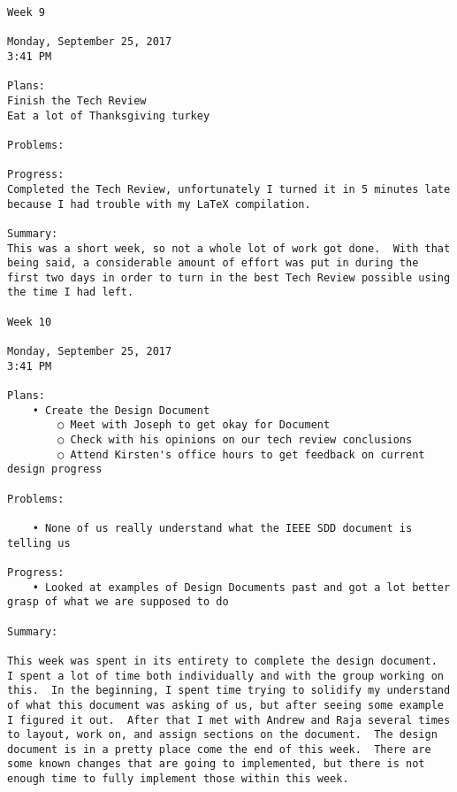 \begin{lstlisting}
Week 9

Monday, September 25, 2017
3:41 PM

Plans:
Finish the Tech Review
Eat a lot of Thanksgiving turkey

Problems:

Progress:
Completed the Tech Review, unfortunately I turned it in 5 minutes late because I had trouble with my LaTeX compilation.

Summary:
This was a short week, so not a whole lot of work got done.  With that being said, a considerable amount of effort was put in during the first two days in order to turn in the best Tech Review possible using the time I had left.

Week 10

Monday, September 25, 2017
3:41 PM

Plans:
	• Create the Design Document
		○ Meet with Joseph to get okay for Document
		○ Check with his opinions on our tech review conclusions
		○ Attend Kirsten's office hours to get feedback on current design progress

Problems:
	
	• None of us really understand what the IEEE SDD document is telling us

Progress:
	• Looked at examples of Design Documents past and got a lot better grasp of what we are supposed to do

Summary:

This week was spent in its entirety to complete the design document.  I spent a lot of time both individually and with the group working on this.  In the beginning, I spent time trying to solidify my understand of what this document was asking of us, but after seeing some example I figured it out.  After that I met with Andrew and Raja several times to layout, work on, and assign sections on the document.  The design document is in a pretty place come the end of this week.  There are some known changes that are going to implemented, but there is not enough time to fully implement those within this week.

\end{lstlisting}
